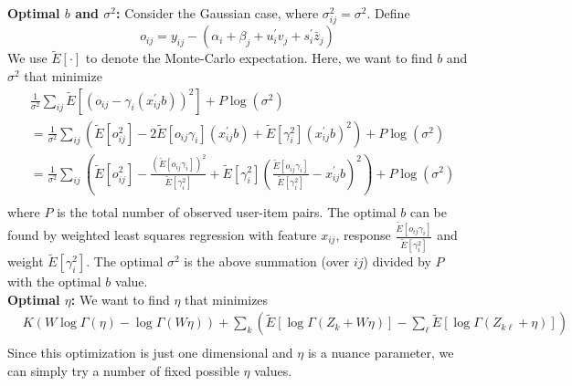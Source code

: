 {\bf Optimal $b$ and $\sigma^2$:} Consider the Gaussian case, where $\sigma_{ij}^2 = \sigma^2$. Define
$$
o_{ij} = y_{ij} - (\alpha_i + \beta_j + u_i^\prime v_j + s_i^\prime \bar{z}_j)
$$
We use $\tilde{E}[\cdot]$ to denote the Monte-Carlo expectation. Here, we want to find $b$ and $\sigma^2$ that minimize
\begin{equation*}
\begin{split}
&	\frac{1}{\sigma^2} \sum_{ij} 
		\tilde{E}[(o_{ij} - \gamma_i(x_{ij}^{\prime}b))^2]
		+ P \log(\sigma^2) \\
&=	\frac{1}{\sigma^2} \sum_{ij} \left(
			\tilde{E}[o_{ij}^2] 
			- 2\tilde{E}[o_{ij}\gamma_i] (x_{ij}^{\prime}b)
			+ \tilde{E}[\gamma_i^2] (x_{ij}^{\prime}b)^2
		\right)
		+ P \log(\sigma^2) \\
&=	\frac{1}{\sigma^2} \sum_{ij} \left(
			\tilde{E}[o_{ij}^2]
			- \frac{(\tilde{E}[o_{ij}\gamma_i])^2}{\tilde{E}[\gamma_i^2]}
			+ \tilde{E}[\gamma_i^2] \left(
					\frac{\tilde{E}[o_{ij}\gamma_i]}{\tilde{E}[\gamma_i^2]}
					- x_{ij}^{\prime} b
				\right)^2
		\right)
		+ P \log(\sigma^2) \\
\end{split}
\end{equation*}
where $P$ is the total number of observed user-item pairs. The optimal $b$ can be found by weighted least squares regression with feature $x_{ij}$, response $\frac{\tilde{E}[o_{ij}\gamma_i]}{\tilde{E}[\gamma_i^2]}$ and weight $\tilde{E}[\gamma_i^2]$. The optimal $\sigma^2$ is the above summation (over $ij$) divided by $P$ with the optimal $b$ value.
\\

{\bf Optimal $\eta$:} We want to find $\eta$ that minimizes
\begin{equation*}
\begin{split}
& K \left( W \log\Gamma(\eta) 
				- \log\Gamma(W \eta) \right)
				+ \sum_k \left(
						\tilde{E}[\log\Gamma(Z_k + W \eta)] -
						\sum_\ell \tilde{E}[\log\Gamma(Z_{k\ell} + \eta)]
				  \right) \\
\end{split}
\end{equation*}
Since this optimization is just one dimensional and $\eta$ is a nuance parameter, we can simply try a number of fixed possible $\eta$ values.
\\

